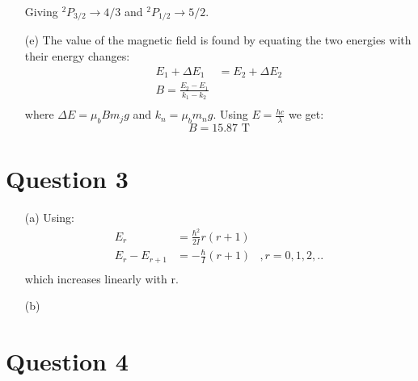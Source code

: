 \documentclass[10pt,a4paper]{article}
\begin{document}
\begin{itemize}
	Giving $^{2}P_{3/2} \rightarrow 4/3$ and $^{2}P_{1/2} \rightarrow 5/2$.

	\item[(e)] The value of the magnetic field is found by equating the two energies with their energy changes:
		\begin{align*}
			E_{1} + \Delta E_{1} &= E_{2} + \Delta E_{2} \\
			B = \frac{E_{2} - E_{1}}{k_{1}-k_{2}} \\
		\end{align*}
	where $\Delta E = \mu_{b}B m_{j}g$ and $k_{n} = \mu_{b}m_{n}g$. Using $E = \frac{hc}{\lambda}$ we get:
		\begin{equation*}
			B = 15.87 \mbox{ T}
		\end{equation*}
\end{itemize}

\section*{Question 3}
\begin{itemize}
	\item[(a)] Using:
		\begin{align*}
			E_{r} &= \frac{\hbar^{2}}{2I}r(r+1) &\\
			E_{r} - E_{r+1} &= -\frac{\hbar}{I}(r+1) &, r = 0,1,2,.. \\
		\end{align*}
		which increases linearly with r.
	
	\item[(b)] 
\end{itemize}
\section*{Question 4}
\end{document}
